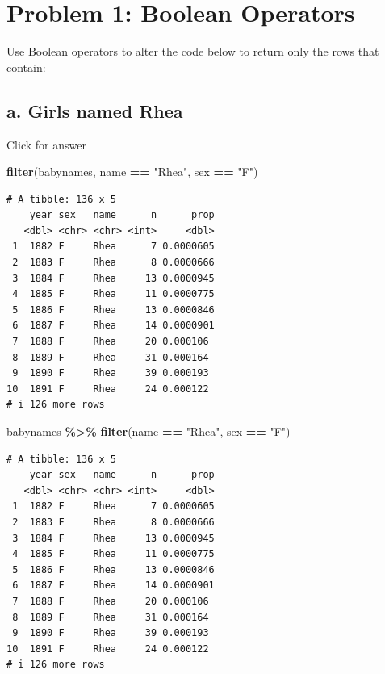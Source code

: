 \documentclass[
]{book}
\newenvironment{Shaded}{\begin{snugshade}}{\end{snugshade}}
\newcommand{\FunctionTok}[1]{\textcolor[rgb]{0.13,0.29,0.53}{\textbf{#1}}}
\newcommand{\NormalTok}[1]{#1}
\newcommand{\SpecialCharTok}[1]{\textcolor[rgb]{0.81,0.36,0.00}{\textbf{#1}}}
\newcommand{\StringTok}[1]{\textcolor[rgb]{0.31,0.60,0.02}{#1}}
\begin{document}
\hypertarget{problem-1-boolean-operators}{%
\section{Problem 1: Boolean Operators}\label{problem-1-boolean-operators}}

Use Boolean operators to alter the code below to return only the rows that contain:

\hypertarget{a.-girls-named-rhea}{%
\subsection{a. Girls named Rhea}\label{a.-girls-named-rhea}}

Click for answer

\begin{Shaded}
\begin{Highlighting}[]
\FunctionTok{filter}\NormalTok{(babynames, name }\SpecialCharTok{==} \StringTok{"Rhea"}\NormalTok{, sex }\SpecialCharTok{==} \StringTok{"F"}\NormalTok{)}
\end{Highlighting}
\end{Shaded}

\begin{verbatim}
# A tibble: 136 x 5
    year sex   name      n      prop
   <dbl> <chr> <chr> <int>     <dbl>
 1  1882 F     Rhea      7 0.0000605
 2  1883 F     Rhea      8 0.0000666
 3  1884 F     Rhea     13 0.0000945
 4  1885 F     Rhea     11 0.0000775
 5  1886 F     Rhea     13 0.0000846
 6  1887 F     Rhea     14 0.0000901
 7  1888 F     Rhea     20 0.000106 
 8  1889 F     Rhea     31 0.000164 
 9  1890 F     Rhea     39 0.000193 
10  1891 F     Rhea     24 0.000122 
# i 126 more rows
\end{verbatim}

\begin{Shaded}
\begin{Highlighting}[]
\NormalTok{babynames }\SpecialCharTok{\%\textgreater{}\%}  \FunctionTok{filter}\NormalTok{(name }\SpecialCharTok{==} \StringTok{"Rhea"}\NormalTok{, sex }\SpecialCharTok{==} \StringTok{"F"}\NormalTok{)}
\end{Highlighting}
\end{Shaded}

\begin{verbatim}
# A tibble: 136 x 5
    year sex   name      n      prop
   <dbl> <chr> <chr> <int>     <dbl>
 1  1882 F     Rhea      7 0.0000605
 2  1883 F     Rhea      8 0.0000666
 3  1884 F     Rhea     13 0.0000945
 4  1885 F     Rhea     11 0.0000775
 5  1886 F     Rhea     13 0.0000846
 6  1887 F     Rhea     14 0.0000901
 7  1888 F     Rhea     20 0.000106 
 8  1889 F     Rhea     31 0.000164 
 9  1890 F     Rhea     39 0.000193 
10  1891 F     Rhea     24 0.000122 
# i 126 more rows
\end{verbatim}
\end{document}
